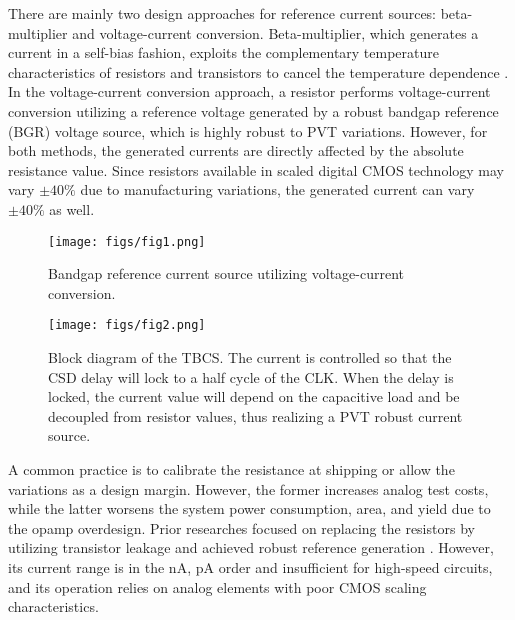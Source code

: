 \documentclass[paper]{ieice}
\begin{document}
There are mainly two design approaches for reference current sources: beta-multiplier and voltage-current conversion. Beta-multiplier, which generates a current in a self-bias fashion, exploits the complementary temperature characteristics of resistors and transistors to cancel the temperature dependence \cite{azcona2014precision, osipov2016temperature, osipov2019compact, wang20190, lee20121, wadhwa2017high}. In the voltage-current conversion approach, a resistor performs voltage-current conversion utilizing a reference voltage generated by a robust bandgap reference (BGR) voltage source, which is highly robust to PVT variations\cite{banba1999cmos, ueno2009300, ueno20101, huang2020sub, wu2015low}. However, for both methods, the generated currents are directly affected by the absolute resistance value. Since resistors available in scaled digital CMOS technology may vary $\pm40\%$ due to manufacturing variations, the generated current can vary $\pm40\%$ as well.

\begin{figure}[!t]
\centering
 \texttt{[image: figs/fig1.png]}
  \caption{Bandgap reference current source utilizing voltage-current conversion.}
\label{bandgap}
\end{figure}

\begin{figure*}[!t]
\centering
 \texttt{[image: figs/fig2.png]}
  \caption{Block diagram of the TBCS. The current is controlled so that the CSD delay will lock to a half cycle of the CLK. When the delay is locked, the current value will depend on the capacitive load and be decoupled from resistor values, thus realizing a PVT robust current source.}
  \label{fig2}
\end{figure*}

A common practice is to calibrate the resistance at shipping or allow the variations as a design margin. However, the former increases analog test costs, while the latter worsens the system power consumption, area, and yield due to the opamp overdesign. Prior researches focused on replacing the resistors by utilizing transistor leakage and achieved robust reference generation \cite{hirose2010nano, hirose2010cmos, osaki20131, choi201423pw}. However, its current range is in the nA, pA order and insufficient for high-speed circuits, and its operation relies on analog elements with poor CMOS scaling characteristics.
\end{document}
